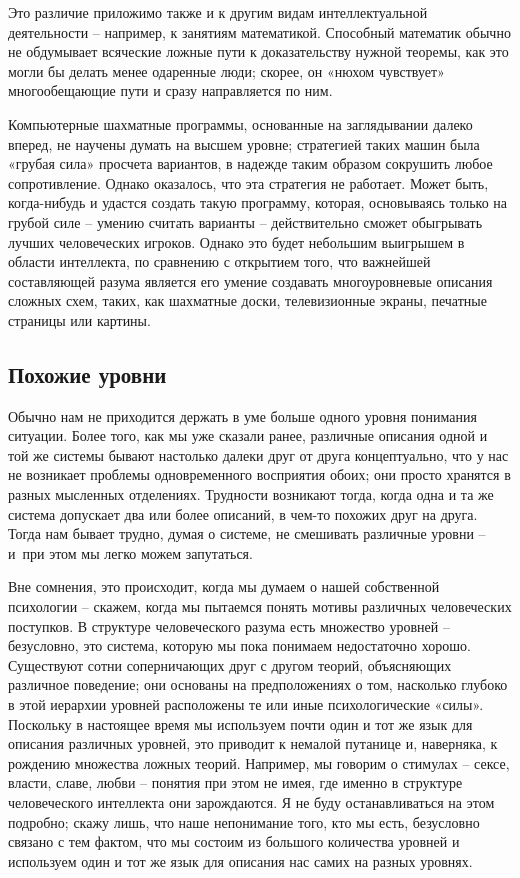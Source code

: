 \documentclass[../main.tex]{subfiles}
\begin{document}
Это различие приложимо также и к другим видам интеллектуальной деятельности \--- например, к занятиям математикой. Способный математик обычно не обдумывает всяческие ложные пути к доказательству нужной теоремы, как это могли бы делать менее одаренные люди; скорее, он «нюхом чувствует» многообещающие пути и сразу направляется по ним.

Компьютерные шахматные программы, основанные на заглядывании далеко вперед, не научены думать на высшем уровне; стратегией таких машин была «грубая сила» просчета вариантов, в надежде таким образом сокрушить любое сопротивление. Однако оказалось, что эта стратегия не работает. Может быть, когда-нибудь и удастся создать такую программу, которая, основываясь только на грубой силе \--- умению считать варианты \--- действительно сможет обыгрывать лучших человеческих игроков. Однако это будет небольшим выигрышем в области интеллекта, по сравнению с открытием того, что важнейшей составляющей разума является его умение создавать многоуровневые описания сложных схем, таких, как шахматные доски, телевизионные экраны, печатные страницы или картины.


\subsection{Похожие уровни}

Обычно нам не приходится держать в уме больше одного уровня понимания ситуации. Более того, как мы уже сказали ранее, различные описания одной и той же системы бывают настолько далеки друг от друга концептуально, что у нас не возникает проблемы одновременного восприятия обоих; они просто хранятся в разных мысленных отделениях. Трудности возникают тогда, когда одна и та же система допускает два или более описаний, в чем-то похожих друг на друга. Тогда нам бывает трудно, думая о системе, не смешивать различные уровни \--- и~при этом мы легко можем запутаться.

Вне сомнения, это происходит, когда мы думаем о нашей собственной психологии \--- скажем, когда мы пытаемся понять мотивы различных человеческих поступков. В структуре человеческого разума есть множество уровней \--- безусловно, это система, которую мы пока понимаем недостаточно хорошо. Существуют сотни соперничающих друг с другом теорий, объясняющих различное поведение; они основаны на предположениях о том, насколько глубоко в этой иерархии уровней расположены те или иные психологические «силы». Поскольку в настоящее время мы используем почти один и тот же язык для описания различных уровней, это приводит к немалой путанице и, наверняка, к рождению множества ложных теорий. Например, мы говорим о стимулах \--- сексе, власти, славе, любви \--- понятия при этом не имея, где именно в структуре человеческого интеллекта они зарождаются. Я не буду останавливаться на этом подробно; скажу лишь, что наше непонимание того, кто мы есть, безусловно связано с тем фактом, что мы состоим из большого количества уровней и используем один и тот же язык для описания нас самих на разных уровнях.
\end{document}
